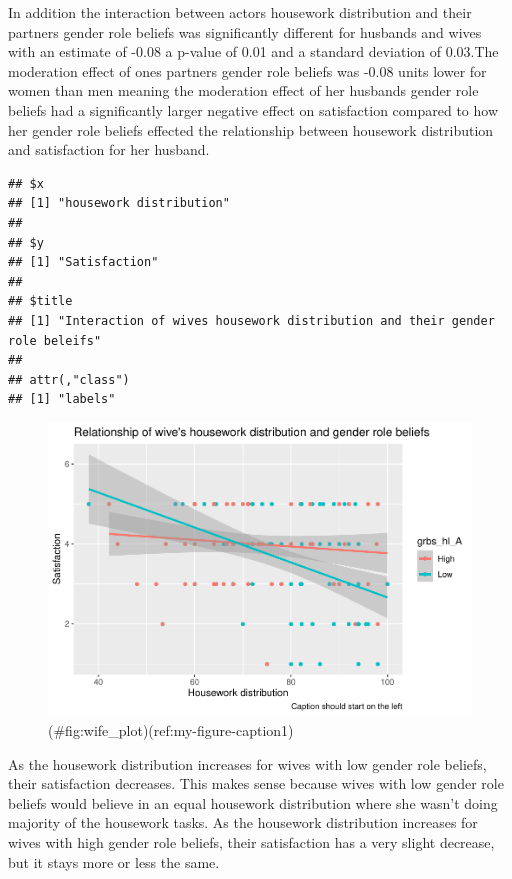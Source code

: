 \documentclass[
  man,floatsintext]{apa6}
\begin{document}
In addition the interaction between actors housework distribution and their partners gender role beliefs was significantly different for husbands and wives with an estimate of -0.08 a p-value of 0.01 and a standard deviation of 0.03.The moderation effect of ones partners gender role beliefs was -0.08 units lower for women than men meaning the moderation effect of her husbands gender role beliefs had a significantly larger negative effect on satisfaction compared to how her gender role beliefs effected the relationship between housework distribution and satisfaction for her husband.

\begin{verbatim}
## $x
## [1] "housework distribution"
## 
## $y
## [1] "Satisfaction"
## 
## $title
## [1] "Interaction of wives housework distribution and their gender role beleifs"
## 
## attr(,"class")
## [1] "labels"
\end{verbatim}

\begin{figure}
\centering
\includegraphics{results_files/figure-latex/wife_plot-1.pdf}
\caption{(\#fig:wife\_plot)(ref:my-figure-caption1)}
\end{figure}



As the housework distribution increases for wives with low gender role beliefs, their satisfaction decreases. This makes sense because wives with low gender role beliefs would believe in an equal housework distribution where she wasn't doing majority of the housework tasks. As the housework distribution increases for wives with high gender role beliefs, their satisfaction has a very slight decrease, but it stays more or less the same.
\end{document}
